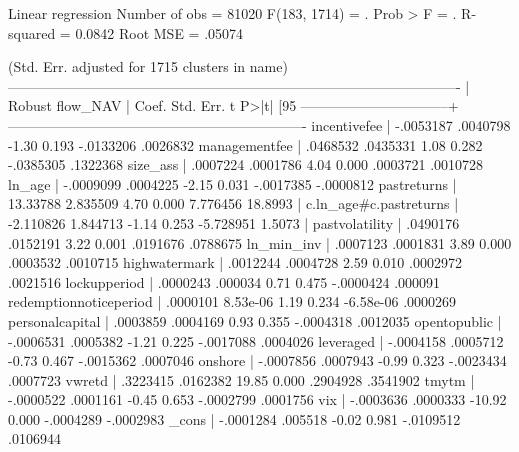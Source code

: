Linear regression                                      Number of obs =   81020
                                                 F(183,  1714) =       .
                                                 Prob > F      =       .
                                                 R-squared     =  0.0842
                                                 Root MSE      =  .05074

                                             (Std. Err. adjusted for 1715 clusters in name)
-------------------------------------------------------------------------------------------------
                          |               Robust
                 flow_NAV |      Coef.   Std. Err.      t    P>|t|     [95%
--------------------------------+----------------------------------------------------------------
             incentivefee |  -.0053187   .0040798    -1.30   0.193    -.0133206    .0026832
            managementfee |   .0468532   .0435331     1.08   0.282    -.0385305    .1322368
                 size_ass |   .0007224   .0001786     4.04   0.000     .0003721    .0010728
                   ln_age |  -.0009099   .0004225    -2.15   0.031    -.0017385   -.0000812
              pastreturns |   13.33788   2.835509     4.70   0.000     7.776456     18.8993
                          |
   c.ln_age#c.pastreturns |  -2.110826   1.844713    -1.14   0.253    -5.728951      1.5073
                          |
           pastvolatility |   .0490176   .0152191     3.22   0.001     .0191676    .0788675
               ln_min_inv |   .0007123   .0001831     3.89   0.000     .0003532    .0010715
            highwatermark |   .0012244   .0004728     2.59   0.010     .0002972    .0021516
             lockupperiod |   .0000243    .000034     0.71   0.475    -.0000424     .000091
   redemptionnoticeperiod |   .0000101   8.53e-06     1.19   0.234    -6.58e-06    .0000269
          personalcapital |   .0003859   .0004169     0.93   0.355    -.0004318    .0012035
             opentopublic |  -.0006531   .0005382    -1.21   0.225    -.0017088    .0004026
                leveraged |  -.0004158   .0005712    -0.73   0.467    -.0015362    .0007046
                  onshore |  -.0007856   .0007943    -0.99   0.323    -.0023434    .0007723
                   vwretd |   .3223415   .0162382    19.85   0.000     .2904928    .3541902
                    tmytm |  -.0000522   .0001161    -0.45   0.653    -.0002799    .0001756
                      vix |  -.0003636   .0000333   -10.92   0.000    -.0004289   -.0002983
                    _cons |  -.0001284    .005518    -0.02   0.981    -.0109512    .0106944
